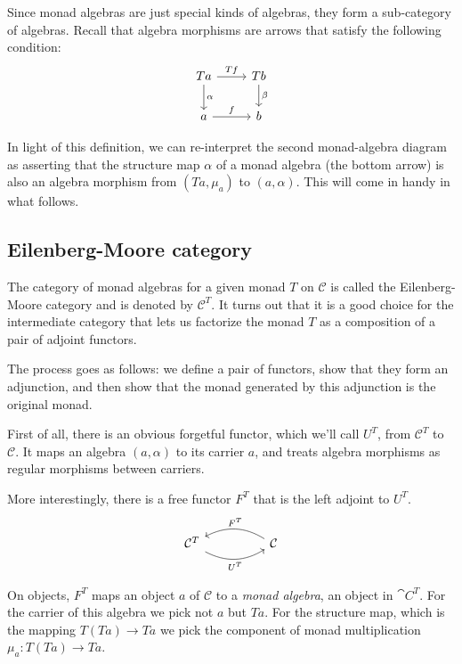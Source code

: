 \documentclass[DaoFP]{subfiles}
\begin{document}
Since monad algebras are just special kinds of algebras, they form a sub-category of algebras. Recall that algebra morphisms are arrows that satisfy the following condition:
\[
 \begin{tikzcd}
 T a 
 \arrow[r, "T f"]
 \arrow[d, "\alpha"]
 & T b
\arrow[d, "\beta"]
 \\
 a
 \arrow[r, "f"]
 & b
  \end{tikzcd}
\]

In light of this definition, we can re-interpret the second monad-algebra diagram as asserting that the structure map $\alpha$ of a monad algebra (the bottom arrow) is also an algebra morphism from $(T a, \mu_a)$ to $(a, \alpha)$. This will come in handy in what follows.

\subsection{Eilenberg-Moore category}

The category of monad algebras for a given monad $T$ on $ \mathcal{C}$ is called the Eilenberg-Moore category and is denoted by $ \mathcal{C}^T$. It turns out that it is a good choice for the intermediate category that lets us factorize the monad $T$ as a composition of a pair of adjoint functors.

The process goes as follows: we define a pair of functors, show that they form an adjunction, and then show that the monad generated by this adjunction is the original monad.

First of all, there is an obvious forgetful functor, which we'll call $U^T$, from $ \mathcal{C}^T$ to $ \mathcal{C}$. It maps an algebra $(a, \alpha)$ to its carrier $a$, and treats algebra morphisms as regular morphisms between carriers. 

More interestingly, there is a free functor $F^T$ that is the left adjoint to $U^T$. 
\[
 \begin{tikzcd}
   \mathcal{C}^T
    \arrow[rr, bend right, "U^T"']
&&
  \mathcal{C}
  \arrow[ll, bend right, "F^T"']
 \end{tikzcd}
\]

On objects, $F^T$ maps an object $a$ of $ \mathcal{C}$ to a \emph{monad algebra}, an object in $\cat{C}^T$. For the carrier of this algebra we pick not $a$ but $T a$. For the structure map, which is the mapping $T (T a) \to T a$ we pick the component of monad multiplication $\mu_a \colon T(T a) \to T a$. 
\end{document}
